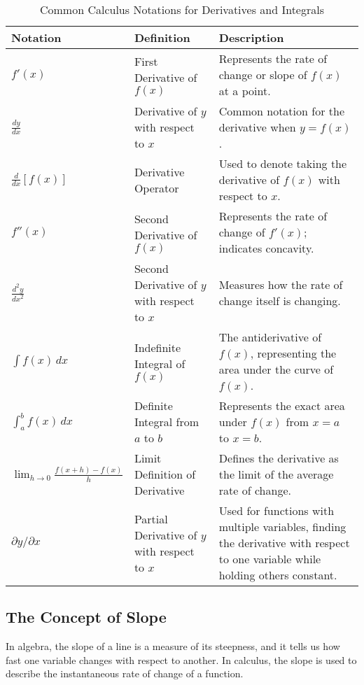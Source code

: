 \begin{table}[h!]
    \centering
    \begin{tabular}{|l|p{3cm}|p{5cm}|}
        \hline
        \textbf{Notation} & \textbf{Definition} & \textbf{Description} \\
        \hline
        $f'(x)$ & First Derivative of $f(x)$ & Represents the rate of change or slope of $f(x)$ at a point. \\
        \hline
        $\frac{dy}{dx}$ & Derivative of $y$ with respect to $x$ & Common notation for the derivative when $y = f(x)$. \\
        \hline
        $\frac{d}{dx}\left[ f(x) \right]$ & Derivative Operator & Used to denote taking the derivative of $f(x)$ with respect to $x$. \\
        \hline
        $f''(x)$ & Second Derivative of $f(x)$ & Represents the rate of change of $f'(x)$; indicates concavity. \\
        \hline
        $\frac{d^2y}{dx^2}$ & Second Derivative of $y$ with respect to $x$ & Measures how the rate of change itself is changing. \\
        \hline
        $\int f(x) \, dx$ & Indefinite Integral of $f(x)$ & The antiderivative of $f(x)$, representing the area under the curve of $f(x)$. \\
        \hline
        $\int_a^b f(x) \, dx$ & Definite Integral from $a$ to $b$ & Represents the exact area under $f(x)$ from $x = a$ to $x = b$. \\
        \hline
        $\lim_{h \to 0} \frac{f(x+h) - f(x)}{h}$ & Limit Definition of Derivative & Defines the derivative as the limit of the average rate of change. \\
        \hline
        $\partial y / \partial x$ & Partial Derivative of $y$ with respect to $x$ & Used for functions with multiple variables, finding the derivative with respect to one variable while holding others constant. \\
        \hline
    \end{tabular}
    \caption{Common Calculus Notations for Derivatives and Integrals}
\end{table}


\subsection{The Concept of Slope}
In algebra, the slope of a line is a measure of its steepness, and it tells us how fast one variable changes with respect to another. In calculus, the slope is used to describe the instantaneous rate of change of a function.

